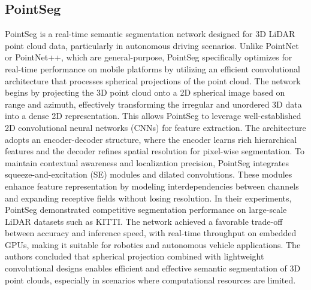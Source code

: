 \documentclass[../report.tex]{subfiles}
\begin{document}
    \subsection{PointSeg}

    PointSeg\cite{PointSeg} is a real-time semantic segmentation network designed for 3D LiDAR point cloud data, particularly in autonomous driving scenarios. Unlike PointNet or PointNet++, which are general-purpose, PointSeg specifically optimizes for real-time performance on mobile platforms by utilizing an efficient convolutional architecture that processes spherical projections of the point cloud.
    The network begins by projecting the 3D point cloud onto a 2D spherical image based on range and azimuth, effectively transforming the irregular and unordered 3D data into a dense 2D representation. This allows PointSeg to leverage well-established 2D convolutional neural networks (CNNs) for feature extraction. The architecture adopts an encoder-decoder structure, where the encoder learns rich hierarchical features and the decoder refines spatial resolution for pixel-wise segmentation.
    To maintain contextual awareness and localization precision, PointSeg integrates squeeze-and-excitation (SE) modules and dilated convolutions. These modules enhance feature representation by modeling interdependencies between channels and expanding receptive fields without losing resolution.
    In their experiments, PointSeg demonstrated competitive segmentation performance on large-scale LiDAR datasets such as KITTI. The network achieved a favorable trade-off between accuracy and inference speed, with real-time throughput on embedded GPUs, making it suitable for robotics and autonomous vehicle applications. The authors concluded that spherical projection combined with lightweight convolutional designs enables efficient and effective semantic segmentation of 3D point clouds, especially in scenarios where computational resources are limited.
\end{document}
